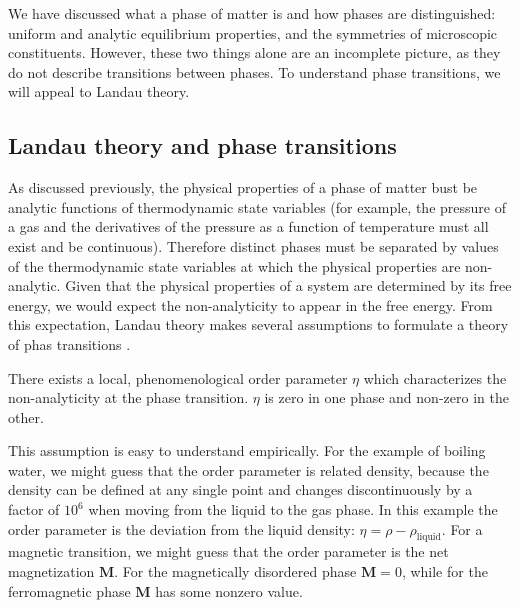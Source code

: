 \begin{center}
	\label{tbl:PhasesSymmetries}
\end{center}

We have discussed what a phase of matter is and how phases are distinguished: uniform and analytic equilibrium properties, and the symmetries of microscopic constituents. However, these two things alone are an incomplete picture, as they do not describe transitions between phases. To understand phase transitions, we will appeal to Landau theory.

\subsection{Landau theory and phase transitions}

As discussed previously, the physical properties of a phase of matter bust be analytic functions of thermodynamic state variables (for example, the pressure of a gas and the derivatives of the pressure as a function of temperature must all exist and be continuous). Therefore distinct phases must be separated by values of the thermodynamic state variables at which the physical properties are non-analytic. Given that the physical properties of a system are determined by its free energy, we would expect the non-analyticity to appear in the free energy. From this expectation, Landau theory makes several assumptions to formulate a theory of phas transitions \cite{Landau1969}.

\begin{assumption}
There exists a local, phenomenological order parameter $\eta$ which characterizes the non-analyticity at the phase transition. $\eta$ is zero in one phase and non-zero in the other.
\end{assumption}

This assumption is easy to understand empirically. For the example of boiling water, we might guess that the order parameter is related density, because the density can be defined at any single point and changes discontinuously by a factor of $10^6$ when moving from the liquid to the gas phase. In this example the order parameter is the deviation from the liquid density: $\eta = \rho - \rho_{\text{liquid}}$. For a magnetic transition, we might guess that the order parameter is the net magnetization $\mathbf{M}$. For the magnetically disordered phase $\mathbf{M} = 0$, while for the ferromagnetic phase $\mathbf{M}$ has some nonzero value.

